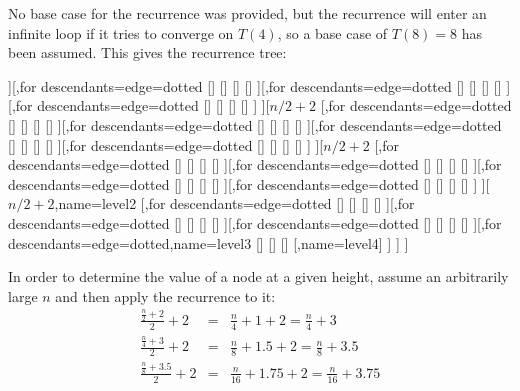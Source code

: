 
No base case for the recurrence was provided, but the recurrence will enter an infinite loop if it tries to converge on $T(4)$, so a base case of $T(8) = 8$ has been assumed.  This gives the recurrence tree:
\newlength{\leafnodelength}
\settowidth{\leafnodelength}{$\scriptscriptstyle n/4 +$}
\newsavebox{\leafnode}
\begin{center}
\begin{forest}
[$n$, for tree={s sep=-1mm},name=level1
	[$n/2 + 2$
		[\usebox{\leafnode},for descendants={edge=dotted}
			[]
			[]
			[]
			[]
		][\usebox{\leafnode},for descendants={edge=dotted}
			[]
			[]
			[]
			[]
		][\usebox{\leafnode},for descendants={edge=dotted}
			[]
			[]
			[]
			[]
		][\usebox{\leafnode},for descendants={edge=dotted}
			[]
			[]
			[]
			[]
		]
	][$n/2 + 2$
		[\usebox{\leafnode},for descendants={edge=dotted}
			[]
			[]
			[]
			[]
		][\usebox{\leafnode},for descendants={edge=dotted}
			[]
			[]
			[]
			[]
		][\usebox{\leafnode},for descendants={edge=dotted}
			[]
			[]
			[]
			[]
		][\usebox{\leafnode},for descendants={edge=dotted}
			[]
			[]
			[]
			[]
		]
	][$n/2 + 2$
		[\usebox{\leafnode},for descendants={edge=dotted}
			[]
			[]
			[]
			[]
		][\usebox{\leafnode},for descendants={edge=dotted}
			[]
			[]
			[]
			[]
		][\usebox{\leafnode},for descendants={edge=dotted}
			[]
			[]
			[]
			[]
		][\usebox{\leafnode},for descendants={edge=dotted}
			[]
			[]
			[]
			[]
		]
	][$n/2 + 2$,name=level2
		[\usebox{\leafnode},for descendants={edge=dotted}
			[]
			[]
			[]
			[]
		][\usebox{\leafnode},for descendants={edge=dotted}
			[]
			[]
			[]
			[]
		][\usebox{\leafnode},for descendants={edge=dotted}
			[]
			[]
			[]
			[]
		][\usebox{\leafnode},for descendants={edge=dotted},name=level3
			[]
			[]
			[]
			[,name=level4]
		]
	]
]
\end{forest}
\end{center}
In order to determine the value of a node at a given height, assume an arbitrarily large $n$ and then apply the recurrence to it:
\begin{eqnarray*}
	\frac{\frac{n}{2} + 2}{2} + 2 & = & \frac{n}{4} + 1 + 2 = \frac{n}{4} + 3 \\
	\frac{\frac{n}{4} + 3}{2} + 2 & = & \frac{n}{8} + 1.5 + 2 = \frac{n}{8} + 3.5 \\
	\frac{\frac{n}{8} + 3.5}{2} + 2 & = & \frac{n}{16} + 1.75 + 2 = \frac{n}{16} + 3.75
\end{eqnarray*}
